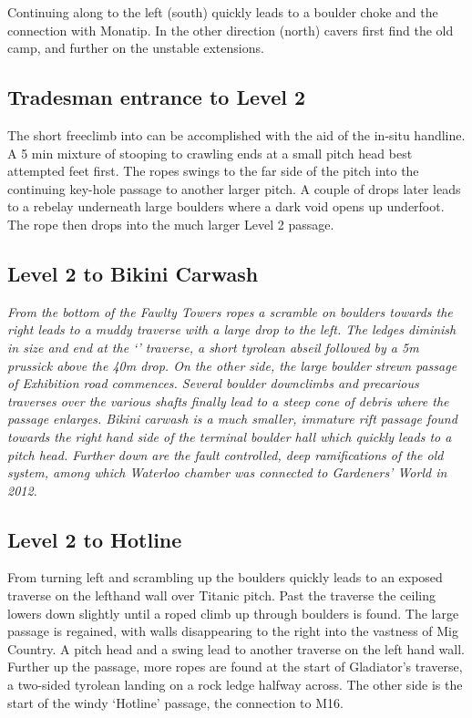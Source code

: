  Continuing along  to the left (south) quickly leads to a boulder choke and the connection with Monatip. In the other direction (north) cavers first find the old  camp, and further on the unstable  extensions.

\subsection{Tradesman entrance to Level 2}
The short freeclimb into  can be accomplished with the aid of the in-situ handline. A 5 min mixture of stooping to crawling ends at a small pitch head best attempted feet first. The ropes swings to the far side of the pitch into the continuing key-hole passage  to another larger pitch. A couple of drops later leads to a rebelay underneath large boulders where a dark void opens up underfoot. The rope then drops into the much larger Level 2 passage.

\subsection{Level 2 to Bikini Carwash}
\textit{From the bottom of the Fawlty Towers ropes a scramble on boulders towards the right leads to a muddy traverse with a large drop to the left. The ledges diminish in size and end at the `\protect{}' traverse, a short tyrolean abseil followed by a 5m prussick above the 40m drop. On the other side, the large boulder strewn passage of Exhibition road commences. Several boulder downclimbs and precarious traverses over the various shafts finally lead to a steep cone of debris where the passage enlarges. Bikini carwash is a much smaller, immature rift passage found towards the right hand side of the terminal boulder hall which quickly leads to a pitch head. Further down are the fault controlled, deep ramifications of the old system, among which Waterloo chamber was connected to Gardeners' World in 2012.}

\subsection{Level 2 to  Hotline}
From  turning left and scrambling up the boulders quickly leads to an exposed traverse on the lefthand wall over Titanic pitch. Past the traverse the ceiling lowers down slightly until a roped climb up through boulders is found. The large passage is regained, with walls disappearing to the right into the vastness of Mig Country. A pitch head and a swing lead to another traverse on the left hand wall. Further up the passage, more ropes are found at the start of Gladiator's traverse, a two-sided tyrolean landing on a rock ledge halfway across. The other side is the start of the windy `Hotline' passage, the connection to M16.


